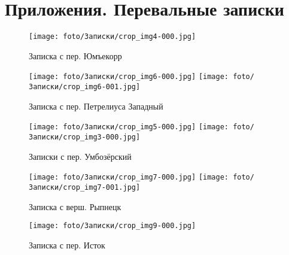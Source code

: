 \newpage
\section{Приложения. Перевальные записки}
\begin{figure}[H]
    \centering
    \texttt{[image: foto/Записки/crop\_img4-000.jpg]}
    \caption{Записка с пер. Юмъекорр}
\end{figure}

\begin{figure}
    \centering
    \texttt{[image: foto/Записки/crop\_img6-000.jpg]}
    \texttt{[image: foto/Записки/crop\_img6-001.jpg]}
    \caption{Записка с пер. Петрелиуса Западный}
\end{figure}

\begin{figure}
    \centering
    \texttt{[image: foto/Записки/crop\_img5-000.jpg]}
    \texttt{[image: foto/Записки/crop\_img3-000.jpg]}
    \caption{Записки с пер. Умбозёрский}
\end{figure}

\begin{figure}
    \centering
    \texttt{[image: foto/Записки/crop\_img7-000.jpg]}
    \break
    \break
    \texttt{[image: foto/Записки/crop\_img7-001.jpg]}
    \caption{Записка с верш. Рыпнецк}
\end{figure}

\begin{figure}
    \centering
    \texttt{[image: foto/Записки/crop\_img9-000.jpg]}
    \caption{Записка с пер. Исток}
\end{figure}
